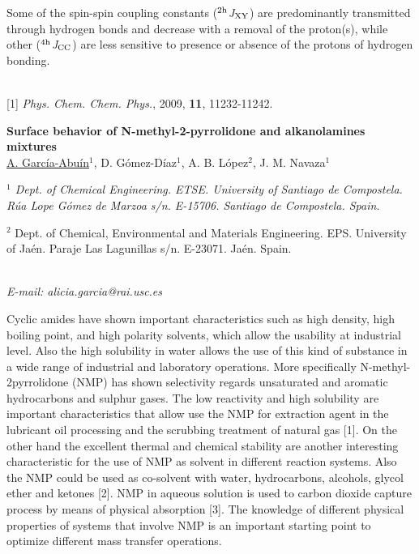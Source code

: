 Some of the spin-spin coupling constants ($^{\rm 2h}$\textit{J}$_{\rm XY}$)
are predominantly transmitted through hydrogen bonds and decrease
with a removal of the proton(s),
while other ($^{\rm 4h}$\textit{J}$_{\rm CC}$) are less sensitive
to presence or absence of the protons of hydrogen bonding.
\\
\begin{figure}[h]
 \centerline{}
 \caption[]{}\label{figure 1}
\end{figure}
\\
{\footnotesize
[1] {\textit{Phys. Chem. Chem. Phys.}}, 2009, \textbf{11}, 11232-11242.
\newline
}
\newpage
\setcounter{figure}{0}
\begin{center}
{\bf \Large
Surface behavior of N-methyl-2-pyrrolidone and
alkanolamines mixtures
}
\\
\vspace{0.5cm}
\underline{A. García-Abuín}$^{1}$, D. Gómez-Díaz$^{1}$, A. B. López$^{2}$, J. M. Navaza$^{1}$
\\
\vspace{0.5cm}
{\it 
$^{1}$ Dept. of Chemical Engineering. ETSE. University of Santiago de Compostela. Rúa Lope Gómez de
Marzoa s/n. E-15706. Santiago de Compostela. Spain.

$^{2}$ Dept. of Chemical, Environmental and Materials Engineering. EPS. University of Jaén. Paraje Las
Lagunillas s/n. E-23071. Jaén. Spain.
}
\\
\vspace{0.5cm}
{\it E-mail: alicia.garcia@rai.usc.es}
\\
\vspace{0.5cm}
\end{center}
Cyclic amides have shown important characteristics such as high density,
high boiling point, and high polarity solvents, which allow the usability at industrial
level. Also the high solubility in water allows the use of this kind of substance in a
wide range of industrial and laboratory operations. More specifically N-methyl-2pyrrolidone
(NMP) has shown selectivity regards unsaturated and aromatic
hydrocarbons and sulphur gases. The low reactivity and high solubility are important
characteristics that allow use the NMP for extraction agent in the lubricant oil
processing and the scrubbing treatment of natural gas [1]. On the other hand the
excellent thermal and chemical stability are another interesting characteristic for the
use of NMP as solvent in different reaction systems. Also the NMP could be used as
co-solvent with water, hydrocarbons, alcohols, glycol ether and ketones [2]. NMP in
aqueous solution is used to carbon dioxide capture process by means of physical
absorption [3]. The knowledge of different physical properties of systems that
involve NMP is an important starting point to optimize different mass transfer
operations.

